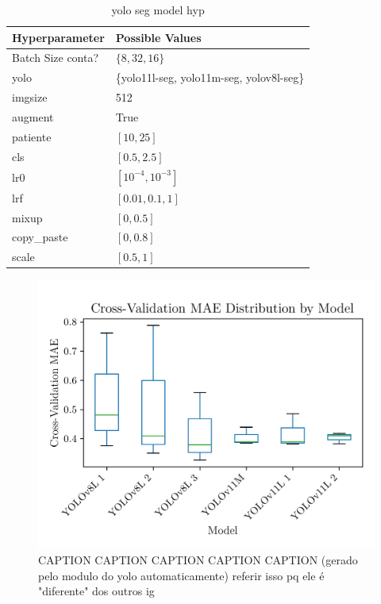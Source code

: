 \documentclass[conference]{IEEEtran}
\begin{document}
\begin{table}[H]
\centering
\caption{yolo seg model hyp}
\label{parametroszulp}
\begin{tabular}{ll}
\toprule
\textbf{Hyperparameter} & \textbf{Possible Values} \\
\midrule
Batch Size conta? & $\{8, 32, 16\}$ \\
yolo & \{yolo11l-seg, yolo11m-seg, yolov8l-seg\} \\
imgsize & 512 \\
augment & True \\
patiente & $[10, 25]$ \\
cls & $[0.5, 2.5]$ \\
lr0 & $[10^{-4}, 10^{-3}]$ \\
lrf & $[0.01, 0.1, 1]$ \\
mixup & $[0, 0.5]$ \\
copy\_paste & $[0, 0.8]$ \\
scale & $[0.5, 1]$ \\
\bottomrule
\end{tabular}
\end{table}

\begin{figure}[H]
    \centering
    \includegraphics[width=1\linewidth]{assets/model02_mae_boxplot.png}
    \caption{CAPTION CAPTION CAPTION CAPTION CAPTION (gerado pelo modulo do yolo automaticamente) referir isso pq ele é "diferente" dos outros ig}
    \label{fig:model02_mae_boxplot}
\end{figure}
\end{document}
